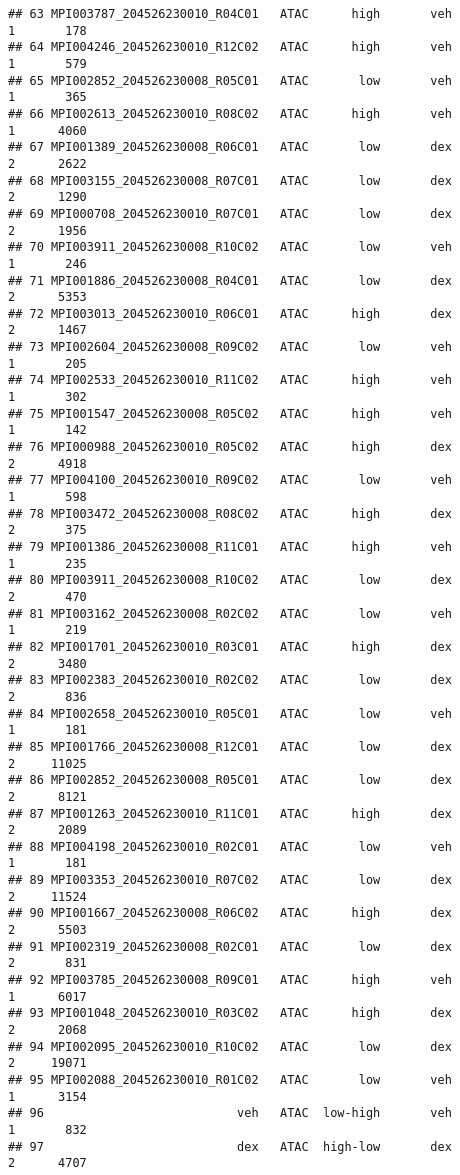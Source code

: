 \documentclass[
]{article}
\begin{document}
\begin{verbatim}
## 63 MPI003787_204526230010_R04C01   ATAC      high       veh         1       178
## 64 MPI004246_204526230010_R12C02   ATAC      high       veh         1       579
## 65 MPI002852_204526230008_R05C01   ATAC       low       veh         1       365
## 66 MPI002613_204526230010_R08C02   ATAC      high       veh         1      4060
## 67 MPI001389_204526230008_R06C01   ATAC       low       dex         2      2622
## 68 MPI003155_204526230008_R07C01   ATAC       low       dex         2      1290
## 69 MPI000708_204526230010_R07C01   ATAC       low       dex         2      1956
## 70 MPI003911_204526230008_R10C02   ATAC       low       veh         1       246
## 71 MPI001886_204526230008_R04C01   ATAC       low       dex         2      5353
## 72 MPI003013_204526230010_R06C01   ATAC      high       dex         2      1467
## 73 MPI002604_204526230008_R09C02   ATAC       low       veh         1       205
## 74 MPI002533_204526230010_R11C02   ATAC      high       veh         1       302
## 75 MPI001547_204526230008_R05C02   ATAC      high       veh         1       142
## 76 MPI000988_204526230010_R05C02   ATAC      high       dex         2      4918
## 77 MPI004100_204526230010_R09C02   ATAC       low       veh         1       598
## 78 MPI003472_204526230008_R08C02   ATAC      high       dex         2       375
## 79 MPI001386_204526230008_R11C01   ATAC      high       veh         1       235
## 80 MPI003911_204526230008_R10C02   ATAC       low       dex         2       470
## 81 MPI003162_204526230008_R02C02   ATAC       low       veh         1       219
## 82 MPI001701_204526230010_R03C01   ATAC      high       dex         2      3480
## 83 MPI002383_204526230010_R02C02   ATAC       low       dex         2       836
## 84 MPI002658_204526230010_R05C01   ATAC       low       veh         1       181
## 85 MPI001766_204526230008_R12C01   ATAC       low       dex         2     11025
## 86 MPI002852_204526230008_R05C01   ATAC       low       dex         2      8121
## 87 MPI001263_204526230010_R11C01   ATAC      high       dex         2      2089
## 88 MPI004198_204526230010_R02C01   ATAC       low       veh         1       181
## 89 MPI003353_204526230010_R07C02   ATAC       low       dex         2     11524
## 90 MPI001667_204526230008_R06C02   ATAC      high       dex         2      5503
## 91 MPI002319_204526230008_R02C01   ATAC       low       dex         2       831
## 92 MPI003785_204526230008_R09C01   ATAC      high       veh         1      6017
## 93 MPI001048_204526230010_R03C02   ATAC      high       dex         2      2068
## 94 MPI002095_204526230010_R10C02   ATAC       low       dex         2     19071
## 95 MPI002088_204526230010_R01C02   ATAC       low       veh         1      3154
## 96                           veh   ATAC  low-high       veh         1       832
## 97                           dex   ATAC  high-low       dex         2      4707
\end{verbatim}
\end{document}
